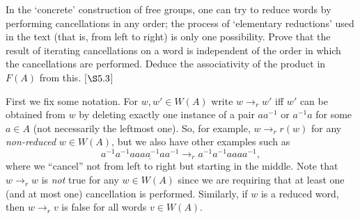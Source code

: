 \begin{exercise}
	In the `concrete' construction of free groups, one can try to reduce words by performing cancellations in any order; the process of `elementary reductions' used in the text (that is, from left to right) is only one possibility. Prove that the result of iterating cancellations on a word is independent of the order in which the cancellations are performed. Deduce the associativity of the product in $F(A)$ from this. [$\S5.3$]
\end{exercise}
\begin{solution}
	First we fix some notation. For $w,w'\in W(A)$ write $w\to_r w'$ iff $w'$ can be obtained from $w$ by deleting exactly one instance of a pair $aa^{-1}$ or $a^{-1}a$ for some $a\in A$ (not necessarily the leftmost one). So, for example, $w \to_r r(w)$ for any \emph{non-reduced} $w\in W(A)$, but we also have other examples such as
	\[
		a^{-1}a^{-1}aa\underline{aa^{-1}}aa^{-1} \to_ra^{-1}a^{-1}aaaa^{-1},
	\]
	where we ``cancel'' not from left to right but starting in the middle. Note that $w\to_r w$ is \emph{not} true for any $w\in W(A)$ since we are requiring that at least one (and at most one) cancellation is performed. Similarly, if $w$ is a reduced word, then $w \to_r v$ is false for all words $v\in W(A)$.
	

\end{solution}
